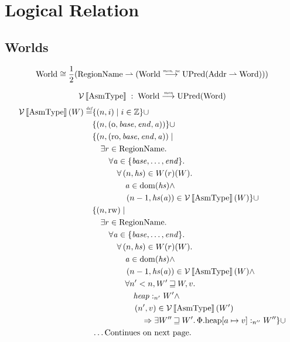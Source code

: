 \documentclass{article}
\newcommand{\update}[2]{[#1 \mapsto #2]}
\newcommand{\sem}[1]{\left\llbracket #1 \right\rrbracket}
\newcommand{\parfun}{\rightharpoonup}
\newcommand{\monnefun}{\stackrel{\textit{\tiny{mon, ne}}}{\longrightarrow}}
\newcommand{\monfun}{\stackrel{\textit{\tiny{mon}}}{\longrightarrow}}
\newcommand{\defeq}{\stackrel{\textit{\tiny{def}}}{=}}
\newcommand{\union}{\mathbin{\cup}}
\DeclareMathOperator{\dom}{dom}
\newcommand{\var}[1]{\mathit{#1}}
\newcommand{\addr}{\var{a}}
\newcommand{\start}{\var{base}}
\newcommand{\addrend}{\var{end}}
\newcommand{\heapseg}{\var{hs}}
\newcommand{\heap}{\var{heap}}
\newcommand{\perm}{\var{perm}}
\newcommand{\stdcap}[1][\perm]{\left(#1,\start,\addrend,\addr \right)}
\newcommand{\plainproj}[1]{\mathrm{#1}}
\newcommand{\memheap}[1][\Phi]{#1.\plainproj{heap}}
\newcommand{\future}{\mathbin{\sqsupseteq}}
\newcommand{\heapSat}[3][\heap]{#1 :_{#2} #3}
\newcommand{\asmType}{\plaindom{AsmType}}
\newcommand{\plaindom}[1]{\mathrm{#1}}
\newcommand{\Words}{\plaindom{Word}}
\newcommand{\Addrs}{\plaindom{Addr}}
\newcommand{\ints}{\mathbb{Z}}
\newcommand{\RegionName}{\plaindom{RegionName}}
\newcommand{\Worlds}{\plaindom{World}}
\newcommand{\UPred}[1]{\plaindom{UPred}(#1)}
\newcommand{\intr}[2]{\mathcal{#1}\sem{#2}}
\newcommand{\valueintr}[1]{\intr{V}{#1}}
\newcommand{\stdvr}{\valueintr{\asmType}}
\newcommand{\npair}[2][n]{\left(#1,#2 \right)}
\newcommand{\plainperm}[1]{\mathrm{#1}}
\newcommand{\noperm}{\plainperm{o}}
\newcommand{\readonly}{\plainperm{ro}}
\newcommand{\readwrite}{\plainperm{rw}}
\begin{document}
\section{Logical Relation}
\label{sec:logical-relation}
\subsection{Worlds}
\[
\Worlds \cong \frac{1}{2} (\RegionName \parfun (\Worlds \monnefun \UPred{\Addrs \parfun \Words}))
\]

\[
\stdvr \; : \;  \Worlds \monfun \UPred{\Words}
\]
\begin{align*}
  \stdvr(W) \defeq & \{ \npair{i} \mid i \in \ints \} 
\union \\
                   & \{ \npair{\stdcap[\noperm] } \} 
\union \\
                   & \{ \npair{\stdcap[\readonly]} \mid \\
                   & \quad \exists r \in \RegionName \ldotp \\
                   & \qquad  \forall \addr \in \{\start, \dots, \addrend \} \ldotp \\
                   & \qquad \quad  \forall \npair{\heapseg} \in W(r)(W)\ldotp \\
                   & \qquad \qquad   \addr \in \dom(\heapseg) \land \\
                   & \qquad \qquad   \npair[n-1]{\heapseg(\addr)} \in \stdvr(W)\} 
\union \\
                   & \{ \npair{\readwrite} \mid \\
                   & \quad \exists r \in \RegionName \ldotp \\
                   & \qquad  \forall \addr \in \{\start, \dots, \addrend \} \ldotp \\
                   & \qquad \quad  \forall \npair{\heapseg} \in W(r)(W)\ldotp \\
                   & \qquad \qquad   \addr \in \dom(\heapseg) \land \\
                   & \qquad \qquad   \npair[n-1]{\heapseg(\addr)} \in \stdvr(W) \land \\
                   & \qquad \qquad   \forall n' < n, W' \future W, v \ldotp \\
                   & \qquad \qquad \quad \heapSat{n'}{W'} \land \\
                   & \qquad \qquad \quad \npair[n']{v} \in \stdvr(W') \\
                   & \qquad \qquad \qquad  \Rightarrow \exists W'' \future W' \ldotp \heapSat[\memheap\update{a}{v}]{n''}{W''} \}
\union \\ & \dots\text{Continues on next page.}
\end{align*}
\end{document}
